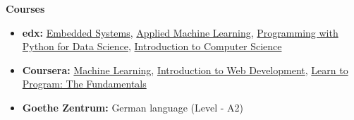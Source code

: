 \documentclass[letterpaper,10pt]{article}
\newcommand{\resheading}[1]{{\large \colorbox{mygrey}{\begin{minipage}{\textwidth}{\textbf{#1 \vphantom{p\^{E}}}}\end{minipage}}}}
\begin{document}
\resheading{Courses}
    \begin{itemize}
        \item \textbf{edx:}
        \href{https://www.edx.org/course/embedded-systems-shape-world-utaustinx-ut-6-03x} {Embedded Systems},
        \href{https://courses.edx.org/courses/course-v1:Microsoft+DAT203.3x+5T2016/info}{Applied Machine Learning},
        \href{https://courses.edx.org/courses/course-v1:Microsoft+DAT210x+6T2016/info}{Programming with Python for Data Science},
        \href{https://www.edx.org/course/introduction-computer-science-harvardx-cs50x}{Introduction to Computer Science}
        \item \textbf{Coursera:}                            \href{https://www.coursera.org/learn/machine-learning}{Machine Learning},
        \href{https://www.coursera.org/learn/web-development/home/welcome}{Introduction to Web Development},
        \href{https://www.coursera.org/learn/learn-to-program}{Learn to Program: The Fundamentals}
        \item \textbf{Goethe Zentrum:} German language (Level - A2)
    \end{itemize}
    
\end{document}
